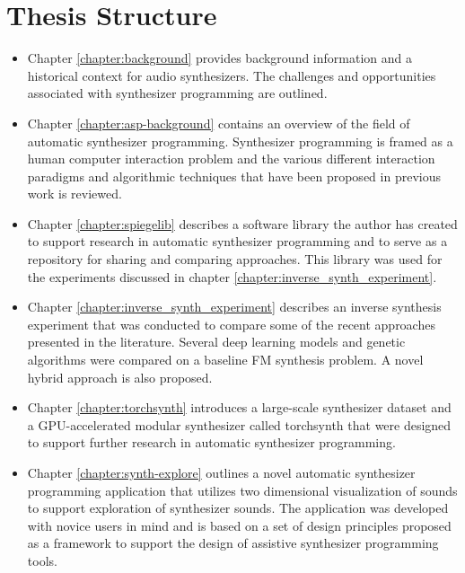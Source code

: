 \section{Thesis Structure}
\begin{itemize}
    \item Chapter \ref{chapter:background} provides background information and a historical context for audio synthesizers. The challenges and opportunities associated with synthesizer programming are outlined.
    \item Chapter \ref{chapter:asp-background} contains an overview of the field of automatic synthesizer programming. Synthesizer programming is framed as a human computer interaction problem and the various different interaction paradigms and algorithmic techniques that have been proposed in previous work is reviewed.
    \item Chapter \ref{chapter:spiegelib} describes a software library the author has created to support research in automatic synthesizer programming and to serve as a repository for sharing and comparing approaches. This library was used for the experiments discussed in chapter \ref{chapter:inverse_synth_experiment}.
    \item Chapter \ref{chapter:inverse_synth_experiment} describes an inverse synthesis experiment that was conducted to compare some of the recent approaches presented in the literature. Several deep learning models and genetic algorithms were compared on a baseline FM synthesis problem. A novel hybrid approach is also proposed.
    \item Chapter \ref{chapter:torchsynth} introduces a large-scale synthesizer dataset and a GPU-accelerated modular synthesizer called torchsynth that were designed to support further research in automatic synthesizer programming.
    \item Chapter \ref{chapter:synth-explore} outlines a novel automatic synthesizer programming application that utilizes two dimensional visualization of sounds to support exploration of synthesizer sounds. The application was developed with novice users in mind and is based on a set of design principles proposed as a framework to support the design of assistive synthesizer programming tools.
\end{itemize}

